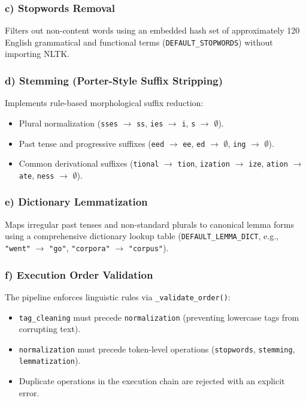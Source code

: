 \documentclass[11pt,a4paper]{article}
\begin{document}
\subsubsection{c) Stopwords Removal}
Filters out non-content words using an embedded hash set of approximately 120 English grammatical and functional terms (\texttt{DEFAULT\_STOPWORDS}) without importing NLTK.

\subsubsection{d) Stemming (Porter-Style Suffix Stripping)}
Implements rule-based morphological suffix reduction:
\begin{itemize}
    \item Plural normalization (\texttt{sses} $\to$ \texttt{ss}, \texttt{ies} $\to$ \texttt{i}, \texttt{s} $\to$ $\emptyset$).
    \item Past tense and progressive suffixes (\texttt{eed} $\to$ \texttt{ee}, \texttt{ed} $\to$ $\emptyset$, \texttt{ing} $\to$ $\emptyset$).
    \item Common derivational suffixes (\texttt{tional} $\to$ \texttt{tion}, \texttt{ization} $\to$ \texttt{ize}, \texttt{ation} $\to$ \texttt{ate}, \texttt{ness} $\to$ $\emptyset$).
\end{itemize}

\subsubsection{e) Dictionary Lemmatization}
Maps irregular past tenses and non-standard plurals to canonical lemma forms using a comprehensive dictionary lookup table (\texttt{DEFAULT\_LEMMA\_DICT}, e.g., \texttt{"went"} $\to$ \texttt{"go"}, \texttt{"corpora"} $\to$ \texttt{"corpus"}).

\subsubsection{f) Execution Order Validation}
The pipeline enforces linguistic rules via \texttt{\_validate\_order()}:
\begin{itemize}
    \item \texttt{tag\_cleaning} must precede \texttt{normalization} (preventing lowercase tags from corrupting text).
    \item \texttt{normalization} must precede token-level operations (\texttt{stopwords}, \texttt{stemming}, \texttt{lemmatization}).
    \item Duplicate operations in the execution chain are rejected with an explicit error.
\end{itemize}
\end{document}
